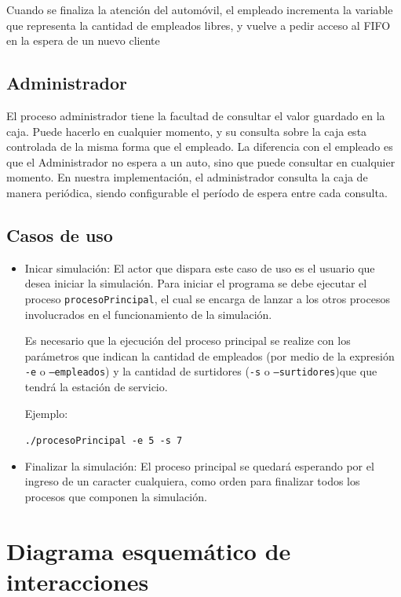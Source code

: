 \documentclass[12pt,a4paper,spanish]{article}
\begin{document}
		Cuando se finaliza la atención del automóvil, el empleado incrementa la variable que representa la cantidad
		de empleados libres, y vuelve a pedir acceso al FIFO en la espera de un nuevo cliente
	
	\subsection{Administrador}
	
	El proceso administrador tiene la facultad de consultar el valor guardado en la caja. Puede hacerlo en cualquier momento, y su consulta sobre la caja esta controlada de la misma forma que el empleado. La diferencia con el empleado es que el Administrador no espera a un auto, sino que puede consultar en cualquier momento. En nuestra implementación, 
	el administrador consulta la caja de manera periódica, siendo configurable el período de espera entre cada consulta.

\subsection{Casos de uso}

\begin{itemize}
	\item Inicar simulación: El actor que dispara este caso de uso es el usuario
	que desea iniciar la simulación. Para iniciar el programa se debe ejecutar el
	proceso \texttt{procesoPrincipal}, el cual se encarga de
	lanzar a los otros procesos involucrados en el funcionamiento de la simulación.

	Es necesario que la ejecución del proceso principal se realize con los parámetros
	que indican la cantidad de empleados (por medio de la expresión \texttt{-e} o \texttt{--empleados})
	y la cantidad de surtidores (\texttt{-s} o \texttt{--surtidores})que que tendrá la
	estación de servicio.

	Ejemplo:

	\texttt{./procesoPrincipal -e 5 -s 7}

	\item Finalizar la simulación: El proceso principal se quedará esperando por el 
	ingreso de un caracter cualquiera, como orden para finalizar todos los procesos
	que componen la simulación.

\end{itemize}


	\section{Diagrama esquemático de interacciones}
	
\end{document}
